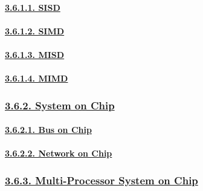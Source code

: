 \documentclass[
]{article}
\begin{document}
\hypertarget{sisd}{%
\paragraph{\texorpdfstring{\protect\hyperlink{sisd-1}{3.6.1.1.
SISD}}{3.6.1.1. SISD}}\label{sisd}}

\hypertarget{simd}{%
\paragraph{\texorpdfstring{\protect\hyperlink{simd-1}{3.6.1.2.
SIMD}}{3.6.1.2. SIMD}}\label{simd}}

\hypertarget{misd}{%
\paragraph{\texorpdfstring{\protect\hyperlink{misd-1}{3.6.1.3.
MISD}}{3.6.1.3. MISD}}\label{misd}}

\hypertarget{mimd}{%
\paragraph{\texorpdfstring{\protect\hyperlink{mimd-1}{3.6.1.4.
MIMD}}{3.6.1.4. MIMD}}\label{mimd}}

\hypertarget{system-on-chip}{%
\subsubsection{\texorpdfstring{\protect\hyperlink{system-on-chip-1}{3.6.2.
System on Chip}}{3.6.2. System on Chip}}\label{system-on-chip}}

\hypertarget{bus-on-chip}{%
\paragraph{\texorpdfstring{\protect\hyperlink{bus-on-chip-1}{3.6.2.1.
Bus on Chip}}{3.6.2.1. Bus on Chip}}\label{bus-on-chip}}

\hypertarget{network-on-chip}{%
\paragraph{\texorpdfstring{\protect\hyperlink{network-on-chip-1}{3.6.2.2.
Network on Chip}}{3.6.2.2. Network on Chip}}\label{network-on-chip}}

\hypertarget{multi-processor-system-on-chip}{%
\subsubsection{\texorpdfstring{\protect\hyperlink{multi-processor-system-on-chip-1}{3.6.3.
Multi-Processor System on
Chip}}{3.6.3. Multi-Processor System on Chip}}\label{multi-processor-system-on-chip}}
\end{document}
